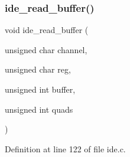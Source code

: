\subsubsection{\texorpdfstring{ide\+\_\+read\+\_\+buffer()}{ide\_read\_buffer()}}
{\footnotesize\ttfamily void ide\+\_\+read\+\_\+buffer (\begin{DoxyParamCaption}\item[{unsigned char}]{channel,  }\item[{unsigned char}]{reg,  }\item[{unsigned int}]{buffer,  }\item[{unsigned int}]{quads }\end{DoxyParamCaption})}



Definition at line 122 of file ide.\+c.



